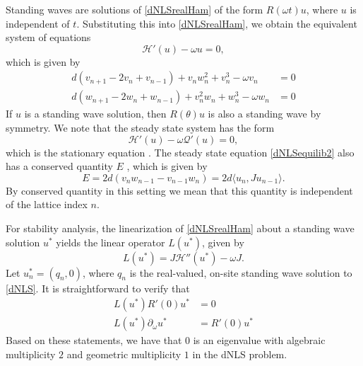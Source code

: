 \documentclass[12pt]{article}
\begin{document}
Standing waves are solutions of \eqref{dNLSrealHam} of the form $R(\omega t) u$, where $u$ is independent of $t$. Substituting this into \eqref{dNLSrealHam}, we obtain the equivalent system of equations
\begin{equation}\label{dNLSequilib1}
\mathcal{H}'(u) - \omega u = 0,
\end{equation}
which is given by
\begin{equation}\label{dNLSequilib2}
\begin{aligned}
d (v_{n+1} - 2 v_n + v_{n-1}) + v_n w_n^2 + v_n^3 - \omega v_n &= 0 \\
d (w_{n+1} - 2 w_n + w_{n-1}) + v_n^2 w_n + w_n^3 - \omega w_n &= 0
\end{aligned}
\end{equation}
If $u$ is a standing wave solution, then $R(\theta) u$ is also a standing wave by symmetry. We note that the steady state system has the form
\begin{equation}
\mathcal{H}'(u) - \omega \mathcal{Q}'(u) = 0,
\end{equation}
which is the stationary equation \cite[(2.15)]{Grillakis1987}. The steady state equation \eqref{dNLSequilib2} also has a conserved quantity $E$ \cite{Johansson2000}, which is given by
\begin{equation}\label{dNLSE}
E = 2d(v_n w_{n-1} - v_{n-1} w_n) = 2d \langle u_n, J u_{n-1} \rangle.
\end{equation}
By conserved quantity in this setting we mean
that this quantity is independent of the lattice
index $n$.

For stability analysis, the linearization of \eqref{dNLSrealHam} about a standing wave solution $u^*$ 
yields the linear operator $L(u^*)$, given by 
\begin{equation}\label{dNLSeigproblem}
L(u^*) = J \mathcal{H}''(u^*)  - \omega J.
\end{equation}
Let $u^*_n = (q_n, 0)$, where $q_n$ is the real-valued, on-site standing wave solution to \eqref{dNLS}. It is straightforward to verify that
\begin{equation}\label{dNLSkernel1}
\begin{aligned}
L(u^*) R'(0) u^* &= 0 \\
L(u^*) \partial_\omega u^* &= R'(0) u^*
\end{aligned}
\end{equation}
Based on these statements, we have that $0$ is an
eigenvalue with algebraic multiplicity $2$ and
geometric multiplicity $1$ in the dNLS problem. 
\end{document}
